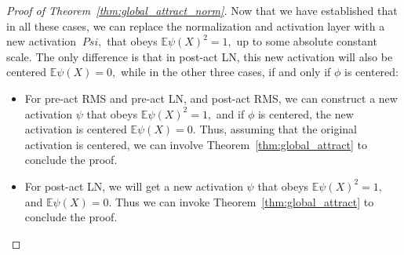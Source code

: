 \documentclass[twoside]{article}
\newcommand{\E}{\mathbb{E}}
\theoremstyle{definition}
\begin{document}
\begin{proof}[Proof of Theorem~\ref{thm:global_attract_norm}]
Now that we have established that in all these cases, we can replace the normalization and activation layer with a new activation $\ Psi,$ that obeys $\E \psi(X)^2 = 1,$ up to some absolute constant scale. The only difference is that in post-act LN, this new activation will also be centered $\E \psi(X) = 0,$ while in the other three cases, if and only if $\phi$ is centered:

\begin{itemize}
    \item For pre-act RMS and pre-act LN, and post-act RMS, we can construct a new activation $\psi$ that obeys $\E \psi(X)^2 = 1,$ and if $\phi$ is centered, the new activation is centered $\E \psi(X) = 0.$ Thus, assuming that the original activation is centered, we can involve Theorem~\ref{thm:global_attract} to conclude the proof.
    \item For post-act LN, we will get a new activation $\psi$ that obeys $\E \psi(X)^2 = 1,$ and $\E \psi(X) = 0.$ Thus we can invoke Theorem~\ref{thm:global_attract} to conclude the proof.
\end{itemize}
\end{proof}
\end{document}
